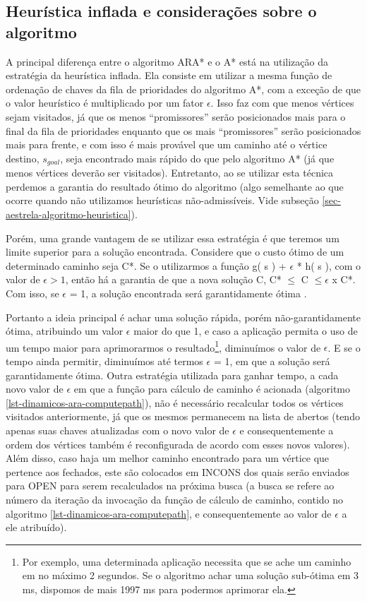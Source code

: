 \subsection{Heurística inflada e considerações sobre o algoritmo}
\label{sec-dinamicos-ara-consideracoes}

A principal diferença entre o algoritmo ARA* e o A* está na utilização da estratégia da heurística inflada. Ela consiste em utilizar a mesma função de ordenação de chaves da fila de prioridades do algoritmo A*, com a exceção de que o valor heurístico é multiplicado por um fator $\epsilon$. Isso faz com que menos vértices sejam visitados, já que os menos ``promissores'' serão posicionados mais para o final da fila de prioridades enquanto que os mais ``promissores'' serão posicionados mais para frente, e com isso é mais provável que um caminho até o vértice destino, $s_{goal}$, seja encontrado mais rápido do que pelo algoritmo A* (já que menos vértices deverão ser visitados). Entretanto, ao se utilizar esta técnica perdemos a garantia do resultado ótimo do algoritmo (algo semelhante ao que ocorre quando não utilizamos heurísticas não-admissíveis. Vide subseção \ref{sec-aestrela-algoritmo-heuristica}).

Porém, uma grande vantagem de se utilizar essa estratégia é que teremos um limite superior para a solução encontrada. Considere que o custo ótimo de um determinado caminho seja C*. Se o utilizarmos a função g( s ) + $\epsilon$ * h( s ), com o valor de $\epsilon > 1$, então há a garantia de que a nova solução C, C* $\leq$ C $\leq \epsilon$ x C*. Com isso, se $\epsilon$ = 1, a solução encontrada será garantidamente ótima \cite{moura2010estudo}.

Portanto a ideia principal é achar uma solução rápida, porém não-garantidamente ótima, atribuindo um valor $\epsilon$ maior do que 1, e caso a aplicação permita o uso de um tempo maior para aprimorarmos o resultado\footnote{Por exemplo, uma determinada aplicação necessita que se ache um caminho em no máximo 2 segundos. Se o algoritmo achar uma solução sub-ótima em 3 ms, dispomos de mais 1997 ms para podermos aprimorar ela.}, diminuímos o valor de $\epsilon$. E se o tempo ainda permitir, diminuímos até termos $\epsilon$ = 1, em que a solução será garantidamente ótima. 
\newpage
Outra estratégia utilizada para ganhar tempo, a cada novo valor de $\epsilon$ em que a função para cálculo de caminho é acionada (algoritmo \ref{lst-dinamicos-ara-computepath}), não é necessário recalcular todos os vértices visitados anteriormente, já que os mesmos permanecem na lista de abertos (tendo apenas suas chaves atualizadas com o novo valor de $\epsilon$ e consequentemente a ordem dos vértices também é reconfigurada de acordo com esses novos valores). Além disso, caso haja um melhor caminho encontrado para um vértice que pertence aos fechados, este são colocados em INCONS dos quais serão enviados para OPEN para serem recalculados na próxima busca (a busca se refere ao número da iteração da invocação da função de cálculo de caminho, contido no algoritmo \ref{lst-dinamicos-ara-computepath}, e consequentemente ao valor de $\epsilon$ a ele atribuído).

